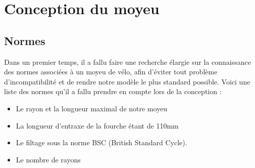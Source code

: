 \documentclass[a4paper,12pt]{article} %
\begin{document}







\section{Conception du moyeu}
\subsection{Normes}
Dans un premier temps, il a fallu faire une recherche élargie sur la connaissance des normes associées à un moyeu de vélo, afin d'éviter tout problème d'incompatibilité et de rendre notre modèle le plus standard possible. Voici une liste des normes qu'il a fallu prendre en compte  lors de la conception :
\begin{itemize}
\item Le rayon et la longueur maximal de notre moyeu
\item La longueur d'entraxe de la fourche étant de 110mm
\item Le filtage sous la norme BSC (British Standard Cycle).
\item Le nombre de rayons
\end{itemize}
\end{document}
